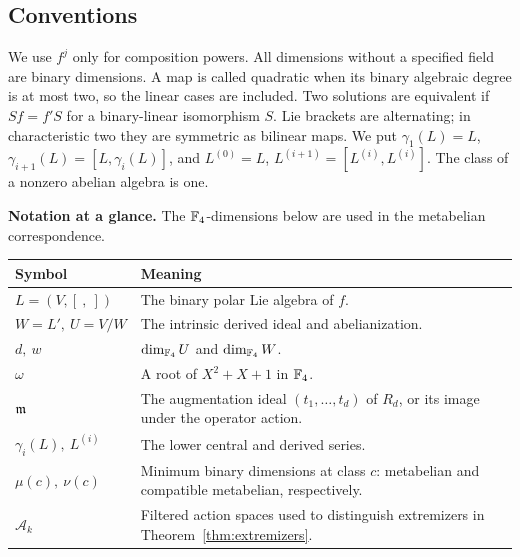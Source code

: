 \subsection{Conventions}

We use \(f^j\) only for composition powers. All dimensions without a
specified field are binary dimensions. A map is called quadratic when its
binary algebraic degree is at most two, so the linear cases are included.
Two solutions are equivalent if \(Sf=f'S\) for a binary-linear isomorphism
\(S\). Lie brackets are alternating; in characteristic two they are
symmetric as bilinear maps. We put
\(\gamma_1(L)=L\), \(\gamma_{i+1}(L)=[L,\gamma_i(L)]\), and
\(L^{(0)}=L\), \(L^{(i+1)}=[L^{(i)},L^{(i)}]\).
The class of a nonzero abelian algebra is one.

\medskip
\noindent\textbf{Notation at a glance.}
The \(\mathbb F_4\)-dimensions below are used in the metabelian correspondence.
\begin{center}
\small
\renewcommand{\arraystretch}{1.12}
\begin{tabular}{@{}p{}p{}@{}}
\toprule
Symbol & Meaning\\
\midrule
\(L=(V,[\ ,\ ])\) & The binary polar Lie algebra of \(f\).\\
\(W=L',\ U=V/W\) & The intrinsic derived ideal and abelianization.\\
\(d,\ w\) & \(\dim_{\mathbb F_4}U\) and \(\dim_{\mathbb F_4}W\).\\
\(\omega\) & A root of \(X^2+X+1\) in \(\mathbb F_4\).\\
\(\mathfrak m\) & The augmentation ideal \((t_1,\ldots,t_d)\) of \(R_d\),
or its image under the operator action.\\
\(\gamma_i(L),\ L^{(i)}\) & The lower central and derived series.\\
\(\mu(c),\ \nu(c)\) & Minimum binary dimensions at class \(c\):
metabelian and compatible metabelian, respectively.\\
\(\mathcal A_k\) & Filtered action spaces used to distinguish extremizers
in Theorem~\ref{thm:extremizers}.\\
\bottomrule
\end{tabular}
\end{center}
